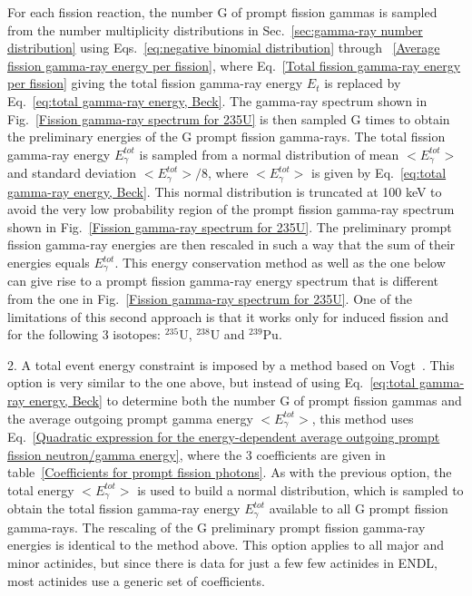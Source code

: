 \begin{list}{}
For each fission reaction, the number G of prompt fission gammas 
is sampled from the number multiplicity distributions in 
Sec.~\ref{sec:gamma-ray number distribution} using 
Eqs.~\ref{eq:negative binomial distribution} through 
~\ref{Average fission gamma-ray energy per fission}, where 
Eq.~\ref{Total fission gamma-ray energy per fission} giving the
total fission gamma-ray energy $E_t$ is replaced by 
Eq.~\ref{eq:total gamma-ray energy, Beck}. The gamma-ray spectrum shown in 
Fig.~\ref{Fission gamma-ray spectrum for 235U} is then sampled G 
times to obtain the preliminary energies of the G prompt fission
gamma-rays. The total fission gamma-ray energy $E^{tot}_{\gamma}$ is 
sampled from a normal distribution of mean $<E^{tot}_{\gamma}>$ 
and standard deviation $<E^{tot}_{\gamma}>/8$, where $<E^{tot}_{\gamma}>$ 
is given by Eq.~\ref{eq:total gamma-ray energy, Beck}. This normal 
distribution is truncated at 100 keV to avoid the very low probability 
region of the prompt fission gamma-ray spectrum shown in
Fig.~\ref{Fission gamma-ray spectrum for 235U}. The preliminary 
prompt fission gamma-ray energies are then rescaled in such a way 
that the sum of their energies equals $E^{tot}_{\gamma}$.  
This energy conservation method as well as the one below can give 
rise to a prompt fission gamma-ray energy spectrum that is different 
from the one in Fig.~\ref{Fission gamma-ray spectrum for 235U}. One 
of the limitations of this second approach is that it works only for 
induced fission and for the following 3 isotopes: $^{235}$U, $^{238}$U 
and $^{239}$Pu.


\item 2.  A total event energy 
constraint is imposed by a method based on Vogt~\cite{Vogt 2008}. This 
option is very similar to the one above, but instead of using 
Eq.~\ref{eq:total gamma-ray energy, Beck} to determine both the number 
G of prompt fission gammas and the average outgoing prompt gamma 
energy $<E^{tot}_{\gamma}>$, this method uses Eq.~\ref{Quadratic 
expression for the energy-dependent average outgoing prompt fission 
neutron/gamma energy}, where the 3 coefficients are given in 
table~\ref{Coefficients for prompt fission photons}. As with the 
previous option, the total energy $<E^{tot}_{\gamma}>$ is used to 
build a normal distribution, which is sampled to obtain the total 
fission gamma-ray energy $E^{tot}_{\gamma}$ available to all G prompt 
fission gamma-rays. The rescaling of the G preliminary prompt fission 
gamma-ray energies is identical to the method above. This option 
applies to all major and minor actinides, but since there is data for 
just a few few actinides in ENDL, most actinides use a generic set of 
coefficients.


\end{list}
